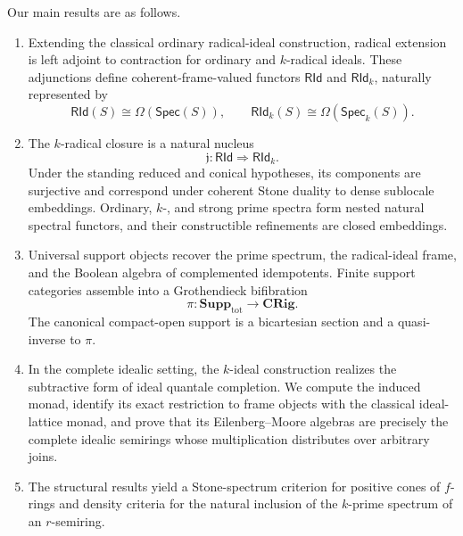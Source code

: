 \documentclass[12pt,leqno]{amsart}
\newcommand{\CRig}{\mathbf{CRig}}
\newcommand{\TotSupp}{\mathbf{Supp}_{\mathrm{tot}}}
\newcommand{\Spec}{\mathsf{Spec}}
\newcommand{\Speck}{\mathsf{Spec}_{k}}
\newcommand{\RId}{\mathsf{RId}}
\newcommand{\RIdk}{\mathsf{RId}_{k}}
\theoremstyle{definition}
\numberwithin{equation}{section}
\theoremstyle{remark}
\begin{document}
Our main results are as follows.
\begin{enumerate}[label=\upshape(\roman*)]
\item Extending the classical ordinary radical-ideal construction, radical extension is left adjoint to contraction for ordinary and $k$-radical ideals. These adjunctions define coherent-frame-valued functors \(\RId\) and \(\RIdk\), naturally represented by
\[
\RId(S)\cong\Omega(\Spec(S)),
\qquad
\RIdk(S)\cong\Omega(\Speck(S)).
\]

\item The $k$-radical closure is a natural nucleus
\[
\mathfrak j\colon\RId\Longrightarrow\RIdk.
\]
Under the standing reduced and conical hypotheses, its components are surjective and correspond under coherent Stone duality to dense sublocale embeddings. Ordinary, $k$-, and strong prime spectra form nested natural spectral functors, and their constructible refinements are closed embeddings.

\item Universal support objects recover the prime spectrum, the radical-ideal frame, and the Boolean algebra of complemented idempotents. Finite support categories assemble into a Grothendieck bifibration
\[
\pi\colon\TotSupp\longrightarrow\CRig.
\]
The canonical compact-open support is a bicartesian section and a quasi-inverse to \(\pi\).

\item In the complete idealic setting, the $k$-ideal construction realizes the subtractive form of ideal quantale completion. We compute the induced monad, identify its exact restriction to frame objects with the classical ideal-lattice monad, and prove that its Eilenberg--Moore algebras are precisely the complete idealic semirings whose multiplication distributes over arbitrary joins.

\item The structural results yield a Stone-spectrum criterion for positive cones of $f$-rings and density criteria for the natural inclusion of the $k$-prime spectrum of an $r$-semiring.
\end{enumerate}
\end{document}
